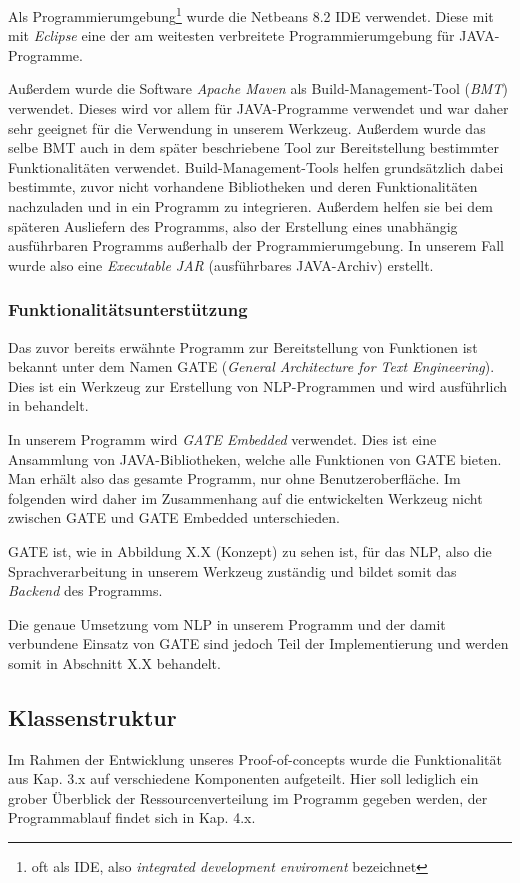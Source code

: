 \documentclass[12pt]{report}
\begin{document}
Als Programmierumgebung\footnote{oft als IDE, also \textit{integrated development enviroment} bezeichnet} wurde die Netbeans 8.2 IDE verwendet. Diese mit mit \textit{Eclipse} eine der am weitesten verbreitete Programmierumgebung für JAVA-Programme. 

Außerdem wurde die Software \textit{Apache Maven} als Build-Management-Tool (\textit{BMT}) verwendet. Dieses wird vor allem für JAVA-Programme verwendet und war daher sehr geeignet für die Verwendung in unserem Werkzeug. Außerdem wurde das selbe BMT auch in dem später beschriebene Tool zur Bereitstellung bestimmter Funktionalitäten verwendet. 
Build-Management-Tools helfen grundsätzlich dabei bestimmte, zuvor nicht vorhandene Bibliotheken und deren Funktionalitäten nachzuladen und in ein Programm zu integrieren. Außerdem helfen sie bei dem späteren Ausliefern des Programms, also der Erstellung eines unabhängig ausführbaren Programms außerhalb der Programmierumgebung.
In unserem Fall wurde also eine \textit{Executable JAR} (ausführbares JAVA-Archiv) erstellt. 

\subsubsection{Funktionalitätsunterstützung}

Das zuvor bereits erwähnte Programm zur Bereitstellung von Funktionen ist bekannt unter dem Namen GATE (\textit{General Architecture for Text Engineering}). Dies ist ein Werkzeug zur Erstellung von NLP-Programmen und wird ausführlich in \cite{rs18} behandelt. 

In unserem Programm wird \textit{GATE Embedded} verwendet. Dies ist eine Ansammlung von JAVA-Bibliotheken, welche alle Funktionen von GATE bieten. Man erhält also das gesamte Programm, nur ohne Benutzeroberfläche. Im folgenden wird daher im Zusammenhang auf die entwickelten Werkzeug nicht zwischen GATE und GATE Embedded unterschieden. 

GATE ist, wie in Abbildung X.X (Konzept) zu sehen ist, für das NLP, also die Sprachverarbeitung in unserem Werkzeug zuständig und bildet somit das \textit{Backend} des Programms.

Die genaue Umsetzung vom NLP in unserem Programm und der damit verbundene Einsatz von GATE sind jedoch Teil der Implementierung und werden somit in Abschnitt X.X behandelt.

\subsection{Klassenstruktur}
Im Rahmen der Entwicklung unseres Proof-of-concepts wurde die Funktionalität aus Kap. 3.x auf verschiedene Komponenten aufgeteilt. Hier soll lediglich ein grober Überblick der Ressourcenverteilung im Programm gegeben werden, der Programmablauf findet sich in Kap. 4.x.
\end{document}

